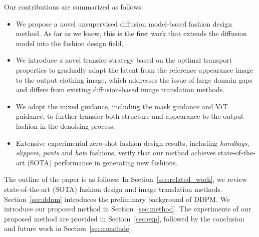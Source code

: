 Our contributions are summarized as follows:
\begin{itemize}
    \item We propose a novel unsupervised diffusion model-based fashion design method. As far as we know, this is the first work that extends the diffusion model into the fashion design field.
    \item We introduce a novel transfer strategy based on the optimal transport properties to gradually adapt the latent from the reference appearance image to the output clothing image, which addresses the issue of large domain gaps and differs from existing diffusion-based image translation methods.
    \item We adopt the mixed guidance, including the mask guidance and ViT guidance, to further transfer both structure and appearance to the output fashion in the denoising process.
    \item Extensive experimental zero-shot fashion design results, including \textit{handbags}, \textit{slippers}, \textit{pants} and \textit{hats} fashions, verify that our method achieves state-of-the-art (SOTA) performance in generating new fashions.
\end{itemize}

The outline of the paper is as follows: In Section~\ref{sec:related_work}, we review state-of-the-art (SOTA) fashion design and image translation methods. Section~\ref{sec:ddpm} introduces the preliminary background of DDPM. We introduce our proposed method in Section~\ref{sec:method}. The experiments of our proposed method are provided in Section~\ref{sec:exp}, followed by the conclusion and future work in Section~\ref{sec:conclude}.